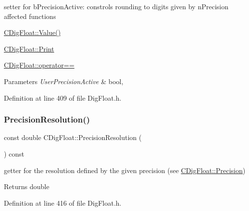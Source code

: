setter for b\+Precision\+Active\+: constrols rounding to digits given by n\+Precision affected functions 


\begin{DoxyItemize}
\item \hyperlink{classCDigFloat_af74b8cd0935294b6371f551b7a1ff640}{C\+Dig\+Float\+::\+Value()}
\item \hyperlink{classCDigFloat_a80731e0970f607114d6d1bde4d02bd39}{C\+Dig\+Float\+::\+Print}
\item \hyperlink{classCDigFloat_ad8980d984bf2bab71d15b830fd0180a5}{C\+Dig\+Float\+::operator==}
\end{DoxyItemize}


\begin{DoxyParams}{Parameters}
{\em User\+Precision\+Active} & bool, \\
\hline
\end{DoxyParams}


Definition at line 409 of file Dig\+Float.\+h.

\mbox{\label{classCDigFloat_ad39db10046bbfd27c2537581bdb7e073}} 
\subsubsection{\texorpdfstring{Precision\+Resolution()}{PrecisionResolution()}}
{\footnotesize\ttfamily const double C\+Dig\+Float\+::\+Precision\+Resolution (\begin{DoxyParamCaption}{ }\end{DoxyParamCaption}) const\hspace{0.3cm}{\ttfamily [inline]}}



getter for the resolution defined by the given precision (see \hyperlink{classCDigFloat_a95875f6f7246debee0d00b0c41c82aee}{C\+Dig\+Float\+::\+Precision}) 

\begin{DoxyReturn}{Returns}
double 
\end{DoxyReturn}


Definition at line 416 of file Dig\+Float.\+h.

\mbox{\label{classCDigFloat_a80731e0970f607114d6d1bde4d02bd39}} 
